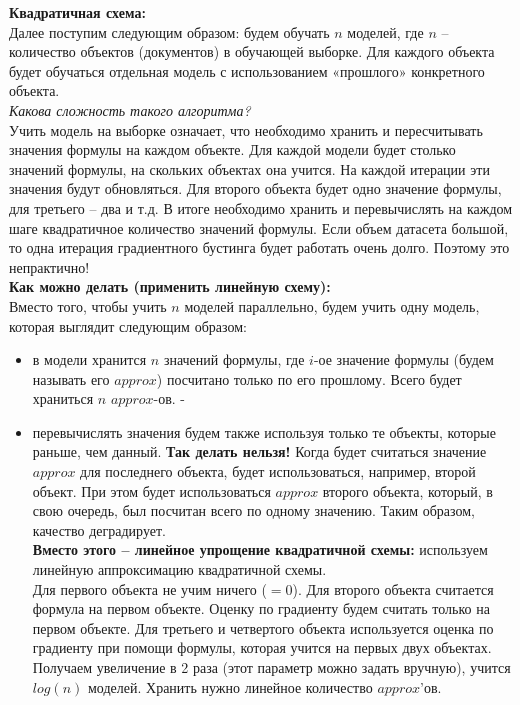 \documentclass[a4paper,12pt]{article}
\begin{document}
\textbf{Квадратичная схема:} \\

Далее поступим следующим образом: будем обучать $n$ моделей, где $n$ – количество объектов (документов) в обучающей выборке. Для каждого объекта будет обучаться отдельная модель с использованием «прошлого» конкретного объекта. \\

\textit{Какова сложность такого алгоритма?} \\

Учить модель на выборке означает, что необходимо хранить и пересчитывать значения формулы на каждом объекте. Для каждой модели будет столько значений формулы, на скольких объектах она учится. На каждой итерации эти значения будут обновляться. Для второго объекта будет одно значение формулы, для третьего – два и т.д. В итоге необходимо хранить и перевычислять на каждом шаге квадратичное количество значений формулы. Если объем датасета большой, то одна итерация градиентного бустинга будет работать очень долго. Поэтому это непрактично! \\

\textbf{Как можно делать (применить линейную схему): } \\

Вместо того, чтобы учить $n$ моделей параллельно, будем учить одну модель, которая выглядит следующим образом:
\begin{itemize}[noitemsep]
\item в модели хранится $n$ значений формулы, где $i$-ое значение формулы (будем называть его $approx$) посчитано только по его прошлому. Всего будет храниться $n$ $approx$-ов.
-\item перевычислять значения будем также используя только те объекты, которые раньше, чем данный. \textbf{Так делать нельзя!} Когда будет считаться значение $approx$ для последнего объекта, будет использоваться, например, второй объект. При этом будет использоваться $approx$ второго объекта, который, в свою очередь, был посчитан всего по одному значению. Таким образом, качество деградирует. \\
\textbf{Вместо этого – линейное упрощение квадратичной схемы:} используем линейную аппроксимацию квадратичной схемы. \\
Для первого объекта не учим ничего ($=0$). Для второго объекта считается формула на первом объекте. Оценку по градиенту будем считать только на первом объекте. Для третьего и четвертого объекта используется оценка по градиенту при помощи формулы, которая учится на первых двух объектах. Получаем увеличение в 2 раза (этот параметр можно задать вручную), учится $log(n)$ моделей. Хранить нужно линейное количество $approx$’ов. 
\end{itemize}
\end{document}
